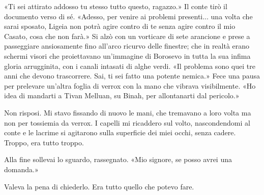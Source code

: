 «Ti sei attirato addosso tu stesso tutto questo, ragazzo.» Il conte tirò
il documento verso di sé. «Adesso, per venire ai problemi presenti...
una volta che sarai sposato, Ligeia non potrà agire contro di te senza
agire contro il mio Casato, cosa che non farà.» Si alzò con un vorticare
di sete arancione e prese a passeggiare ansiosamente fino all'arco
ricurvo delle finestre; che in realtà erano schermi visori che
proiettavano un'immagine di Borosevo in tutta la sua infima gloria
arrugginita, con i canali intasati di alghe verdi. «Il problema sono
quei tre anni che devono trascorrere. Sai, ti sei fatto una potente
nemica.» Fece una pausa per prelevare un'altra foglia di verrox con la
mano che vibrava visibilmente. «Ho idea di mandarti a Tivan Melluan, su
Binah, per allontanarti dal pericolo.»

Non risposi. Mi stavo fissando di nuovo le mani, che tremavano a loro
volta ma non per tossiemia da verrox. I capelli mi ricaddero sul volto,
nascondendomi al conte e le lacrime si agitarono sulla superficie dei
miei occhi, senza cadere. Troppo, era tutto troppo.

Alla fine sollevai lo sguardo, rassegnato. «Mio signore, se posso avrei
una domanda.»

Valeva la pena di chiederlo. Era tutto quello che potevo fare.


